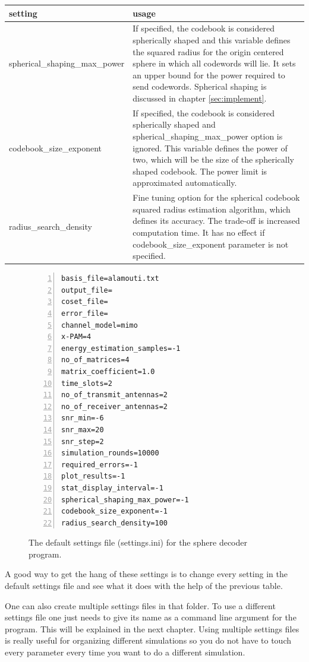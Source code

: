 \documentclass[english,12pt,a4paper,pdftex,sci,utf8]{aaltothesis}
\begin{document}
\pagebreak
\begin{center}
  \begin{tabular}{ | l | p{8.5cm} | }
    \hline
    setting & usage  \\ \hline
    spherical\_shaping\_max\_power & If specified, the codebook is considered spherically shaped and this variable defines the squared radius for the origin centered sphere in which all codewords will lie. It sets an upper bound for the power required to send codewords. Spherical shaping is discussed in chapter \ref{sec:implement}. \\ \hline
    codebook\_size\_exponent & If specified, the codebook is considered spherically shaped and spherical\_shaping\_max\_power option is ignored. This variable defines the power of two, which will be the size of the spherically shaped codebook. The power limit is approximated automatically. \\ \hline
    radius\_search\_density & Fine tuning option for the spherical codebook squared radius estimation algorithm, which defines its accuracy. The trade-off is increased computation time. It has no effect if codebook\_size\_exponent parameter is not specified. \\
    \hline
  \end{tabular}
\end{center}


\begin{figure}[htb]
\begin{Verbatim}[frame=single, numbers=left]
basis_file=alamouti.txt
output_file=
coset_file=
error_file= 
channel_model=mimo            
x-PAM=4                         
energy_estimation_samples=-1   
no_of_matrices=4                
matrix_coefficient=1.0         
time_slots=2                    
no_of_transmit_antennas=2      
no_of_receiver_antennas=2    
snr_min=-6                      
snr_max=20                    
snr_step=2                    
simulation_rounds=10000       
required_errors=-1              
plot_results=-1    
stat_display_interval=-1        
spherical_shaping_max_power=-1
codebook_size_exponent=-1     
radius_search_density=100
\end{Verbatim}
\caption{The default settings file (settings.ini) for the sphere decoder program.}
\label{fig:settings}
\end{figure}
A good way to get the hang of these settings is to change every setting in the default settings file and see what it does with the help of the previous table.
\par One can also create multiple settings files in that folder. To use a different settings file one just needs to give its name as a command line argument for the program. This will be explained in the next chapter. Using multiple settings files is really useful for organizing different simulations so you do not have to touch every parameter every time you want to do a different simulation.
\end{document}
